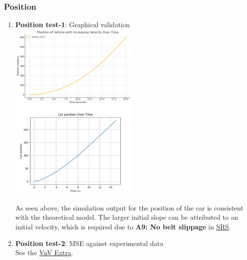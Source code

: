 \documentclass[12pt, titlepage]{article}
\begin{document}
\subsubsection{Position}
\begin{enumerate}
\item{\textbf{Position test-1}: Graphical validation}\\

\includegraphics[width=0.5\textwidth]{theoretical-figures/position.png}
\includegraphics[width=0.5\textwidth]{simulation-figures/car_position.png}

As seen above, the simulation output for the position of the car is consistent with the theoretical model. The larger initial slope can be attributed to an initial velocity, which is required due to \textbf{A9: No belt slippage} in \href{https://github.com/gr812b/CVT-Simulator/blob/develop/docs/SRS/SRS.pdf}{SRS}.

\item{\textbf{Position test-2}: MSE against experimental data}\\
See the \href{https://github.com/gr812b/CVT-Simulator/blob/develop/docs/VnVExtra/VnVExtra.pdf}{VnV Extra}.

\end{enumerate}
\end{document}
